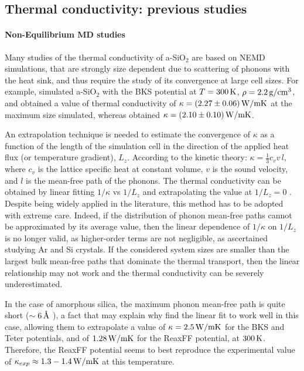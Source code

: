 \subsection{Thermal conductivity: previous studies}
\paragraph{Non-Equilibrium MD studies}
Many studies of the thermal conductivity of a-SiO$_2$ are based on NEMD simulations, that are strongly size dependent due to scattering of phonons with the heat sink, and thus require the study of its convergence at large cell sizes. 
For example, \citet{Tian2017} simulated a-SiO$_2$ with the BKS potential at $T=300\,\mathrm{K}$, $\rho=2.2\,\mathrm{g/cm^3}$, and obtained a value of thermal conductivity of $\kappa=(2.27 \pm 0.06)\,\mathrm{W/mK}$ at the maximum size simulated, whereas \citet{Coquil2011} obtained $\kappa= (2.10 \pm 0.10)\,\mathrm{W/mK}$. 

An extrapolation technique is needed to estimate the convergence of $\kappa$ as a function of the length of the simulation cell in the direction of the applied heat flux (or temperature gradient), $L_z$. According to the kinetic theory: $\kappa = \frac{1}{3} c_v v \,l$, where $c_v$ is the lattice specific heat at constant volume, $v$ is the sound velocity, and $l$ is the mean-free path of the phonons. The thermal conductivity can be obtained by linear fitting $1/\kappa$ vs $1/L_z$ and extrapolating the value at $1/L_z=0$ \cite{Schelling2002}. 
Despite being widely applied in the literature, this method has to be adopted with extreme care. Indeed, if the distribution of phonon mean-free paths cannot be approximated by its average value, then the linear dependence of $1/\kappa$ on $1/L_z$ is no longer valid, as higher-order terms are not negligible, as \citet{Sellan2010} ascertained studying Ar and Si crystals. If the considered system sizes are smaller than the largest bulk mean-free paths that dominate the thermal transport, then the linear relationship may not work and the thermal conductivity can be severely underestimated.

In the case of amorphous silica, the maximum phonon mean-free path is quite short ($\sim 6\,\mathrm{{\mbox{\AA}}}$ \cite{Yu2006}), a fact that may explain why \citet{Tian2017} find the linear fit to work well in this case, allowing them to extrapolate a value of $\kappa=2.5\,\mathrm{W/mK}$ for the BKS and Teter potentials, and of $1.28\,\mathrm{W/mK}$ for the ReaxFF potential, at $300\,\mathrm{K}$. Therefore, the ReaxFF potential seems to best reproduce the experimental value of $\kappa_{exp}\approx 1.3-1.4\,\mathrm{W/mK}$ at this temperature. 


